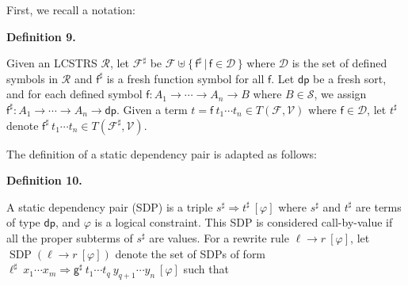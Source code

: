  
 
First, we recall a notation:\par
 
 
 
\par\medskip\noindent\textbf{Definition 9.}\par
 
 
Given an LCSTRS $\mathcal{R}$, let $\mathcal{F}^{\sharp}$ be $\mathcal{F}\uplus\{\,\mathsf{f}^{\sharp}\,|\,\mathsf{f}\in\mathcal{D}\,\}$ where $\mathcal{D}$ is the set of defined symbols in $\mathcal{R}$ and $\mathsf{f}^{\sharp}$ is a fresh function symbol for all $\mathsf{f}$. Let $\mathsf{dp}$ be a fresh sort, and for each defined symbol $\mathsf{f}:{A}_{1}\rightarrow\cdots\rightarrow{A}_{n}\rightarrow B$ where $B\in\mathcal{S}$, we assign $\mathsf{f}^{\sharp}:{A}_{1}\rightarrow\cdots\rightarrow{A}_{n}\rightarrow\mathsf{dp}$. Given a term $t={\mathsf{f}}\ {{t}_{1}\cdots{t}_{n}}\in T(\mathcal{F},\mathcal{V})$ where $\mathsf{f}\in\mathcal{D}$, let $t^{\sharp}$ denote ${\mathsf{f}^{\sharp}}\ {{t}_{1}\cdots{t}_{n}}\in T(\mathcal{F}^{\sharp},\mathcal{V})$.\par
 
 
 
 
The definition of a static dependency pair is adapted as follows:\par
 
 
 
\par\medskip\noindent\textbf{Definition 10.}\par
 
 
A static dependency pair (SDP) is a triple ${s^{\sharp}}\Rightarrow{t^{\sharp}}\ [\varphi]$ where $s^{\sharp}$ and $t^{\sharp}$ are terms of type $\mathsf{dp}$, and $\varphi$ is a logical constraint. This SDP is considered call-by-value if all the proper subterms of $s^{\sharp}$ are values. For a rewrite rule ${\ell}\rightarrow{r}\ [\varphi]$, let $\operatorname{SDP}({\ell}\rightarrow{r}\ [\varphi])$ denote the set of SDPs of form ${{\ell^{\sharp}}\ {{x}_{1}\cdots{x}_{m}}}\Rightarrow{{{\mathsf{g}^{\sharp}}\ {{t}_{1}\cdots{t}_{q}}}\ {{y}_{q+1}\cdots{y}_{n}}}\ [\varphi]$ such that\par
  

